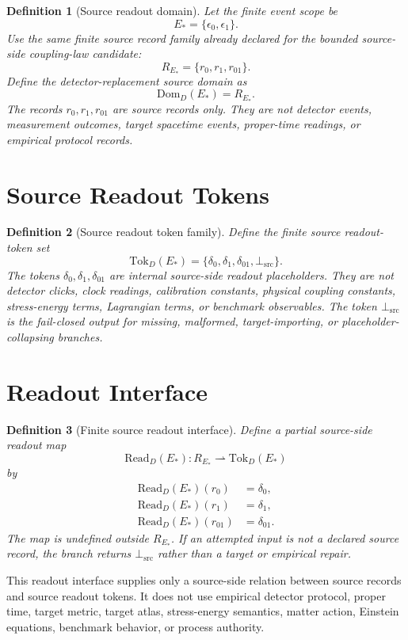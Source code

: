 \documentclass[11pt]{article}
\newcommand{\EStar}{E_{\ast}}
\newcommand{\RStar}{R_{E_{\ast}}}
\newcommand{\DomD}{\mathrm{Dom}_{D}(E_{\ast})}
\newcommand{\ReadD}{\mathrm{Read}_{D}(E_{\ast})}
\newcommand{\TokD}{\mathrm{Tok}_{D}(E_{\ast})}
\newcommand{\BottomSrc}{\bot_{\mathrm{src}}}
\newtheorem{definition}{Definition}
\begin{document}
\begin{definition}[Source readout domain]
Let the finite event scope be
\[
  \EStar=\{\epsilon_0,\epsilon_1\}.
\]
Use the same finite source record family already declared for the bounded
source-side coupling-law candidate:
\[
  \RStar=\{r_0,r_1,r_{01}\}.
\]
Define the detector-replacement source domain as
\[
  \DomD=\RStar.
\]
The records \(r_0,r_1,r_{01}\) are source records only. They are not detector
events, measurement outcomes, target spacetime events, proper-time readings,
or empirical protocol records.
\end{definition}

\section{Source Readout Tokens}

\begin{definition}[Source readout token family]
Define the finite source readout-token set
\[
  \TokD=\{\delta_0,\delta_1,\delta_{01},\BottomSrc\}.
\]
The tokens \(\delta_0,\delta_1,\delta_{01}\) are internal source-side
readout placeholders. They are not detector clicks, clock readings,
calibration constants, physical coupling constants, stress-energy terms,
Lagrangian terms, or benchmark observables. The token \(\BottomSrc\) is the
fail-closed output for missing, malformed, target-importing, or
placeholder-collapsing branches.
\end{definition}

\section{Readout Interface}

\begin{definition}[Finite source readout interface]
Define a partial source-side readout map
\[
  \ReadD:\RStar\rightharpoonup \TokD
\]
by
\[
\begin{aligned}
  \ReadD(r_0) &= \delta_0,\\
  \ReadD(r_1) &= \delta_1,\\
  \ReadD(r_{01}) &= \delta_{01}.
\end{aligned}
\]
The map is undefined outside \(\RStar\). If an attempted input is not a
declared source record, the branch returns \(\BottomSrc\) rather than a target
or empirical repair.
\end{definition}

This readout interface supplies only a source-side relation between source
records and source readout tokens. It does not use empirical detector
protocol, proper time, target metric, target atlas, stress-energy semantics,
matter action, Einstein equations, benchmark behavior, or process authority.
\end{document}
